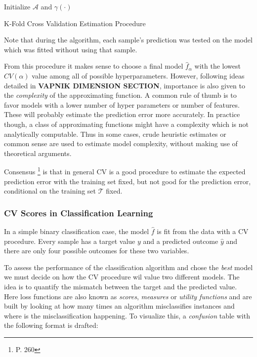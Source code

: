 \documentclass{article}%
\theoremstyle{definition}
\begin{document}
 \begin{algorithm}%
 	\SetAlgoLined
 	Initialize $\mathcal{A}$ and $\gamma(\cdot)$\;
 \caption{K-Fold Cross Validation Estimation Procedure}
\end{algorithm}

Note that during the algorithm, each sample's prediction was tested on the model which was fitted without using that sample. 

From this procedure it makes sense to choose a final  model $\hat{f}_\alpha$ with the lowest $CV(\alpha)$ value among all of possible hyperparameters. However, following ideas detailed in \textbf{VAPNIK DIMENSION SECTION}, importance is also given to the \textit{complexity} of the approximating function. A common rule of thumb is to favor models with a lower number of hyper parameters or number of features. These will probably estimate the prediction error more accurately. In practice though, a class of approximating functions might have a complexity which is not analytically computable. Thus in some cases, crude heuristic estimates or common sense are used to estimate model complexity, without making use of theoretical arguments.


Consensus \footnote{\cite{hastie-elemstatslearn} P. 260} is that in general CV is a good procedure to estimate the expected prediction error with the training set fixed, but not good for the prediction error, conditional on the training set $\mathcal{T}$ fixed.





\subsubsection{CV Scores in Classification Learning}

In a simple binary classification case, the model $\hat{f}$ is fit  from the data with a CV procedure. Every sample has a target value $y$ and a predicted outcome $\hat{y}$ and there are only four possible outcomes for these two variables.  

To assess the performance of the classification algorithm and chose the \textit{best} model we must decide on how the CV procedure wil value two different models. The idea is to quantify the mismatch between the target  and the predicted value. Here loss functions are also known as \textit{scores}, \textit{measures} or \textit{utility functions} and are built by looking at how many times an algorithm  misclassifies instances and where is the misclassification happening. To visualize this, a \textit{confusion} table with the following format is drafted:
\end{document}
